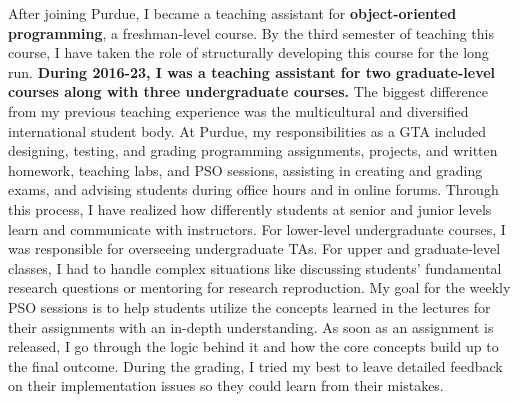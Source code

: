 \documentclass[10pt]{article}
\newcommand{\textcourse}[1]{\textit{#1}}
\begin{document}
After joining Purdue, I became a teaching assistant for 
\textbf{object-oriented programming}, a freshman-level course. By the third semester of teaching this course, 
I have taken the role of structurally developing this course for the long run.
\textbf{During 2016-23, I was a teaching assistant for two graduate-level courses 
along with three undergraduate courses.}
The biggest difference from my previous teaching experience was the multicultural and diversified international student body. At Purdue, my responsibilities as a GTA included designing, testing, and grading programming assignments, projects, and written homework, teaching labs, and PSO sessions, assisting in creating and grading exams, and advising students during office hours and in online forums. Through this process, I have realized how differently students at senior and junior levels learn and communicate with instructors. For lower-level undergraduate courses, I was responsible for overseeing undergraduate TAs. For upper and graduate-level classes, I had to handle complex situations like discussing students' fundamental research questions or mentoring for research reproduction. My goal for the weekly PSO sessions is to help students utilize the concepts learned in the lectures for their assignments with an in-depth understanding. As soon as an assignment is released, I go through the logic behind it and how the core concepts build up to the final outcome. 
%
During the grading, I tried my best to leave detailed feedback on their implementation issues so they could learn from their mistakes.
\end{document}
